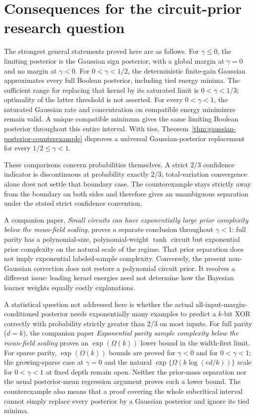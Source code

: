 \documentclass[11pt]{article}
\theoremstyle{remark}
\begin{document}
\section{Consequences for the circuit-prior research question}

The strongest general statements proved here are as follows.
For $\gamma\le0$, the limiting posterior is the Gaussian sign
posterior, with a global margin at $\gamma=0$ and no margin at
$\gamma<0$. For $0<\gamma<1/2$, the deterministic finite-gain
Gaussian approximates every full Boolean posterior, including tied
energy minima. The sufficient range for replacing that kernel by
its saturated limit is $0<\gamma<1/3$; optimality of the latter
threshold is not asserted. For every $0<\gamma<1$, the saturated
Gaussian rate and concentration on compatible energy minimizers
remain valid. A unique compatible minimum gives the same limiting
Boolean posterior throughout this entire interval. With ties,
Theorem~\ref{thm:gaussian-posterior-counterexample} disproves a
universal Gaussian-posterior replacement for every
$1/2\le\gamma<1$.

These comparisons concern probabilities themselves. A strict
$2/3$ confidence indicator is discontinuous at probability exactly
$2/3$; total-variation convergence alone does not settle that
boundary case. The counterexample stays strictly away from the
boundary on both sides and therefore gives an unambiguous
separation under the stated strict confidence convention.

A companion paper, \emph{Small circuits can have exponentially
large prior complexity below the mean-field scaling}, proves a
separate conclusion throughout $\gamma<1$: full parity has a
polynomial-size, polynomial-weight $\tanh$ circuit but exponential
prior complexity on the natural scale of the regime. That prior
separation does not imply exponential labeled-sample complexity.
Conversely, the present non-Gaussian correction does not restore a
polynomial circuit prior. It resolves a different issue: leading
kernel energies need not determine how the Bayesian learner
weights equally costly explanations.

A statistical question not addressed here is whether the actual
all-input-margin-conditioned posterior needs exponentially many
examples to predict a $k$-bit XOR correctly with probability
strictly greater than $2/3$ on most inputs. For full parity ($d=k$),
the companion paper \emph{Exponential parity sample complexity
below the mean-field scaling} proves an $\exp(\Omega(k))$ lower bound in
the width-first limit. For sparse parity, $\exp(\Omega(k))$ bounds are proved
for $\gamma<0$ and for $0<\gamma<1$; the growing-sparse case at $\gamma=0$ and
the natural $\exp\{\Omega(k\log(ed/k))\}$ scale for $0<\gamma<1$ at fixed depth
remain open. Neither the prior-mass
separation nor the usual posterior-mean regression argument proves
such a lower bound. The counterexample also means that a proof covering
the whole subcritical interval cannot simply replace every posterior
by a Gaussian posterior and ignore its tied minima.
\end{document}
